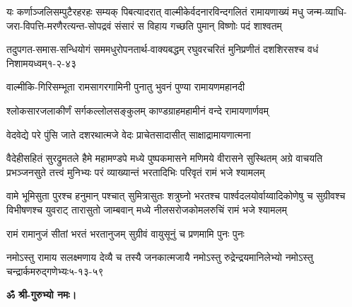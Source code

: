 \fourlineindentedshloka
{यः कर्णाञ्जलिसम्पुटैरहरहः सम्यक् पिबत्यादरात्}
{वाल्मीकेर्वदनारविन्दगलितं रामायणाख्यं मधु}
{जन्म-व्याधि-जरा-विपत्ति-मरणैरत्यन्त-सोपद्रवं}
{संसारं स विहाय गच्छति पुमान् विष्णोः पदं शाश्वतम्}

\annofourlineindentedshloka
{तदुपगत-समास-सन्धियोगं}
{सममधुरोपनतार्थ-वाक्यबद्धम्}
{रघुवरचरितं मुनिप्रणीतं}
{दशशिरसश्च वधं निशामयध्वम्}{१-२-४३}

\twolineshloka
{वाल्मीकि-गिरिसम्भूता रामसागरगामिनी}
{पुनातु भुवनं पुण्या रामायणमहानदी}

\twolineshloka
{श्लोकसारजलाकीर्णं सर्गकल्लोलसङ्कुलम्}
{काण्डग्राहमहामीनं वन्दे रामायणार्णवम्}

\twolineshloka
{वेदवेद्ये परे पुंसि जाते दशरथात्मजे}
{वेदः प्राचेतसादासीत् साक्षाद्रामायणात्मना}

\resetShloka
{}

\fourlineindentedshloka
{वैदेहीसहितं सुरद्रुमतले हैमे महामण्डपे}
{मध्ये पुष्पकमासने मणिमये वीरासने सुस्थितम्}
{अग्रे वाचयति प्रभञ्जनसुते तत्त्वं मुनिभ्यः परं}
{व्याख्यान्तं भरतादिभिः परिवृतं रामं भजे श्यामलम्}

\fourlineindentedshloka
{वामे भूमिसुता पुरश्च हनुमान् पश्चात् सुमित्रासुतः}
{शत्रुघ्नो भरतश्च पार्श्वदलयोर्वाय्वादिकोणेषु च}
{सुग्रीवश्च विभीषणश्च युवराट् तारासुतो जाम्बवान्}
{मध्ये नीलसरोजकोमलरुचिं रामं भजे श्यामलम्}

\twolineshloka
{रामं रामानुजं सीतां भरतं भरतानुजम्}
{सुग्रीवं वायुसूनुं च प्रणमामि पुनः पुनः}

\annofourlineindentedshloka
{नमोऽस्तु रामाय सलक्ष्मणाय}
{देव्यै च तस्यै जनकात्मजायै}
{नमोऽस्तु रुद्रेन्द्रयमानिलेभ्यो}
{नमोऽस्तु चन्द्रार्कमरुद्गणेभ्यः}{५-१३-५९}

\centerline{\textbf{ॐ श्री-गुरुभ्यो नमः।}}

\resetShloka
